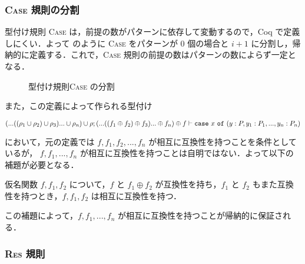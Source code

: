 \subsubsection{\textsc{Case} 規則の分割}

型付け規則 \textsc{Case} は，前提の数がパターンに依存して変動するので，Coq で定義しにくい．よって  のように \textsc{Case} をパターンが $0$ 個の場合と $i + 1$ に分割し，帰納的に定義する．これで，\textsc{Case} 規則の前提の数はパターンの数によらず一定となる．


\begin{figure*}[t]
  \vspace{14pt}

  \caption{型付け規則\textsc{Case} の分割}
  \label{api:case_split}
\end{figure*}


また，この定義によって作られる型付け
\begin{center}
  $(...((\rho_1 \cup \rho_2) \cup \rho_3)... \cup \rho_n) \cup \rho ; (...((f_1 \oplus f_2) \oplus f_3)... \oplus f_n) \oplus f \vdash {\tt case} \ x \ {\tt of} \ (y : P, y_1 : P_1, ..., y_n : P_n)$
\end{center}
において，元の定義では $f, f_1, f_2, ..., f_n$ が相互に互換性を持つことを条件としているが，
$f, f_1, ..., f_n$ が相互に互換性を持つことは自明ではない．よって以下の補題が必要となる．

\begin{lem}
  仮名関数 $f, f_1, f_2$ について，$f$ と $f_1 \oplus f_2$ が互換性を持ち，$f_1$ と $f_2$ もまた互換性を持つとき，$f, f_1, f_2$ は相互に互換性を持つ．
  \label{lem:compatible}
\end{lem}

この補題によって，$f, f_1, ... , f_n$ が相互に互換性を持つことが帰納的に保証される．%



\subsubsection{\textsc{Res} 規則}

